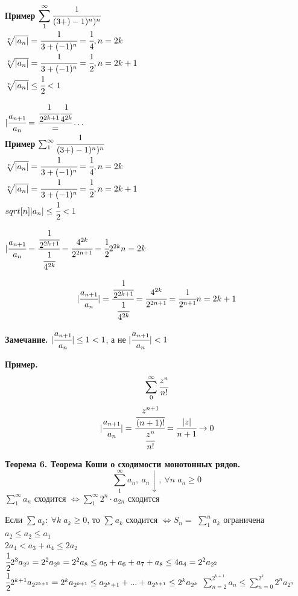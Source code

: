 \documentclass[12pt, a4paper]{article}
\begin{document}
\textbf{Пример}
	$\displaystyle\sum_{1}^{\infty} \cfrac{1}{(3+)-1)^n)^n}$\\
	$\sqrt[n]{|a_n|} = \cfrac{1}{3+(-1)^n} = \cfrac{1}{4}, n = 2k$\\
	$\sqrt[n]{|a_n|} = \cfrac{1}{3+(-1)^n} = \cfrac{1}{2}, n = 2k+1$\\
	$\sqrt[n]{|a_n|} \leq \cfrac{1}{2} < 1$

	$|\cfrac{a_{n+1}}{a_{n}} = \cfrac{\cfrac{1}{2^{2k+1}}{\cfrac{1}{4^{2k}}}} = \dots$\\
\textbf{Пример} 
    $\sum_{1}^{\infty} \cfrac{1}{(3+)-1)^n)^n}$\\
	$\sqrt[n]{|a_n|} = \cfrac{1}{3+(-1)^n} = \cfrac{1}{4}, n = 2k$\\
	$\sqrt[n]{|a_n|} = \cfrac{1}{3+(-1)^n} = \cfrac{1}{2}, n = 2k+1$\\
	$sqrt[n]{|a_n|} \leq \cfrac{1}{2} < 1$

$
	|\cfrac{a_{n+1}}{a_{n}} = \cfrac{\cfrac{1}{2^{2k+1}}}{\cfrac{1}{4^{2k}}} = \cfrac{4^{2k}}{2^{2n+1}} = \cfrac{1}{2}2^{2k}
    n = 2k
$

\[
	|\cfrac{a_{n+1}}{a_{n}}| = \cfrac{\cfrac{1}{2^{2k+1}}}{\cfrac{1}{4^{2k}}} = \cfrac{4^{2k}}{2^{2n+1}} = \cfrac{1}{2^{n+1}}\\
    n = 2k+1
\]

\textbf{Замечание.} $|\cfrac{a_{n+1}}{a_n}| \leq 1 < 1$, а не $|\cfrac{a_{n+1}}{a_n}| < 1$

\textbf{Пример.} \[ \sum_0^\infty \cfrac{z^n}{n!} \]
\[ |\cfrac{a_{n+1}}{a_n}| = \cfrac{\cfrac{z^{n+1}}{(n+1)!}}{\cfrac{z^n}{n!}} = \cfrac{|z|}{n+1} \to 0 \]

\textbf{Теорема 6. Теорема Коши о сходимости монотонных рядов. }
\[\sum^{\infty}_{1} a_n,\ a_n \downarrow,\ \forall n\; a_n \geq 0\]
$ \sum^{\infty}_{1} a_n$ сходится $\Leftrightarrow \sum^{\infty}_{1} 2^n \cdot a_{2n}$ сходится

\begin{tcolorbox}
    Если $ \sum^{}_{} a_k:\ \forall k\; a_k \geq 0$, то $ \sum^{}_{} a_k$ сходится $\Leftrightarrow S_n=$ $ \sum^{n}_{1} a_k$ ограничена\\
    $ a_2 \leq a_2 \leq a_1 $\\
    $2a_4 < a_3 + a_4 \leq 2a_2 $\\
    $\cfrac{1}{2} 2^3 a_{2^3} = 2^2a_{2^3} = 2^2a_8 \leq a_5+a_6+a_7+a_8 \leq 4a_4 = 2^2 a_{2^2}$\\
    $\cfrac{1}{2}2^{k+1} a_{2^{2k+1}} = 2^ka_{2^{k+1}} \leq a_{2^k+1} + ... + a_{2^{k+1}} \leq 2^ka_{2^k}$
    $\sum^{2^{k+1}}_{n=2} a_n \leq \sum^{2^{k}}_{n=0} 2^n a_{2^n}$
\end{tcolorbox}
\end{document}
